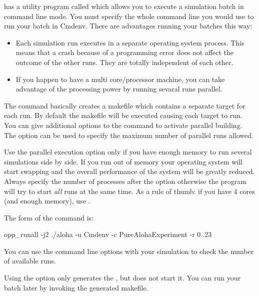 {\opp} has a utility program called  which
allows you to execute a simulation batch in command line mode.
You must specify the whole command line you would use to run
your batch in Cmdenv. There are advantages running your batches
this way:
\begin{itemize}
  \item Each simulation run executes in a separate operating system process.
        This means that a crash because of a programming error does not affect
        the outcome of the other runs. They are totally independent of each other.
  \item If you happen to have a multi core/processor machine, you can take advantage
        of the processing power by running sevaral runs parallel.
\end{itemize}

The command basically creates a makefile which contains
a separate target for each run. By default the makefile will be executed causing each
target to run. You can give additional options to the  command to
activate parallel building. The  option can be used to specify the maximum number
of parallel runs allowed.

\begin{warning}
  Use the parallel execution option only if you have enough memory to run several simulations
  side by side. If you run out of memory your operating system will start swapping and the overall
  performance of the system will be greatly reduced. Always specify the number of processes
  after the  option otherwise the  program will try to start \textit{all}
  runs at the same time. As a rule of thumb: if you have 4 cores (and enough memory), use .
\end{warning}

The form of the command is:
\begin{commandline}
opp_runall -j2 ./aloha -u Cmdenv -c PureAlohaExperiment -r 0..23
\end{commandline}

You can use the  command line options with your simulation to
check the number of available runs.

Using the  option only generates the , but does not start it.
You can run your batch later by invoking the generated makefile.



